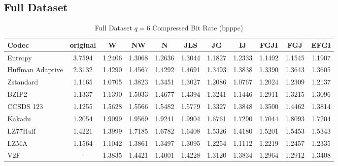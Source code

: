 \documentclass{article}
\begin{document}
\subsection{Full Dataset}
\begin{table}[h!]
\centering
\caption{Full Dataset $q=6$ Compressed Bit Rate (bpppc)}
\begin{tabular}{|l|cccccccccc|}
\hline
Codec &  original &      W &     NW &      N &    JLS &     JG &     IJ &   FGJI &    FGJ &   EFGI \\
\hline
Entropy & 3.7594 & 1.2406 & 1.3068 & 1.2636 & 1.3044 & 1.1827 & 1.2333 & 1.1492 & 1.1545 & 1.1907 \\
\hline
Huffman Adaptive &    2.3132 & 1.4290 & 1.4567 & 1.4292 & 1.4691 & 1.3493 & 1.3838 & 1.3390 & 1.3643 & 1.3605 \\
Zstandard        &    1.1165 & 1.0705 & 1.3823 & 1.3451 & 1.3027 & 1.2086 & 1.0767 & 1.2024 & 1.2309 & 1.2137 \\
BZIP2            &    1.1337 & 1.1390 & 1.5033 & 1.4677 & 1.4394 & 1.3241 & 1.1446 & 1.2911 & 1.3215 & 1.3096 \\
CCSDS 123        &    1.1255 & 1.5628 & 1.5566 & 1.5482 & 1.5779 & 1.3327 & 1.3848 & 1.3500 & 1.4462 & 1.3814 \\
Kakadu           &    1.2054 & 1.9099 & 1.9569 & 1.9241 & 1.9904 & 1.6761 & 1.7290 & 1.7044 & 1.8093 & 1.7204 \\
LZ77Huff         &    1.4221 & 1.3999 & 1.7185 & 1.6782 & 1.6408 & 1.5326 & 1.4180 & 1.5201 & 1.5453 & 1.5343 \\
LZMA             &    1.1564 & 1.1042 & 1.3861 & 1.3497 & 1.3095 & 1.2254 & 1.1112 & 1.2219 & 1.2457 & 1.2335 \\
V2F              &   - & 1.3835 & 1.4421 & 1.4001 & 1.4228 & 1.3120 & 1.3834 & 1.2964 & 1.2912 & 1.3408 \\
\hline
\end{tabular}
\end{table}
\end{document}
